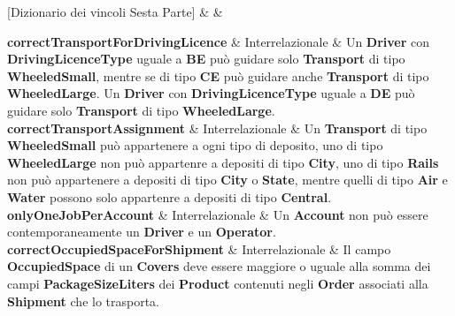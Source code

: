 [Dizionario dei vincoli Sesta Parte]{ &  & }{
    
  \textbf{correctTransportForDrivingLicence} & Interrelazionale &
  {\footnotesize
  Un \textbf{Driver} con \textbf{DrivingLicenceType} uguale a \textbf{BE} può guidare solo \textbf{Transport} di tipo \textbf{WheeledSmall}, mentre se di tipo \textbf{CE} può guidare anche \textbf{Transport} di tipo \textbf{WheeledLarge}. Un \textbf{Driver} con \textbf{DrivingLicenceType} uguale a \textbf{DE} può guidare solo \textbf{Transport} di tipo \textbf{WheeledLarge}.
  }\\

  \textbf{correctTransportAssignment} & Interrelazionale &
  {\footnotesize
  Un \textbf{Transport} di tipo \textbf{WheeledSmall} può appartenere a ogni tipo di deposito, uno di tipo \textbf{WheeledLarge} non può appartenre a depositi di tipo \textbf{City}, uno di tipo \textbf{Rails} non può appartenere a depositi di tipo \textbf{City} o \textbf{State}, mentre quelli di tipo \textbf{Air} e \textbf{Water} possono solo appartenre a depositi di tipo \textbf{Central}.
  }\\

  \textbf{onlyOneJobPerAccount} & Interrelazionale &
  {\footnotesize
  Un \textbf{Account} non può essere contemporaneamente un \textbf{Driver} e un \textbf{Operator}.
  }\\

  \textbf{correctOccupiedSpaceForShipment} & Interrelazionale &
  {\footnotesize
  Il campo \textbf{OccupiedSpace} di un \textbf{Covers} deve essere maggiore o uguale alla somma dei campi \textbf{PackageSizeLiters} dei \textbf{Product} contenuti negli \textbf{Order} associati alla \textbf{Shipment} che lo trasporta.
  }\\

}